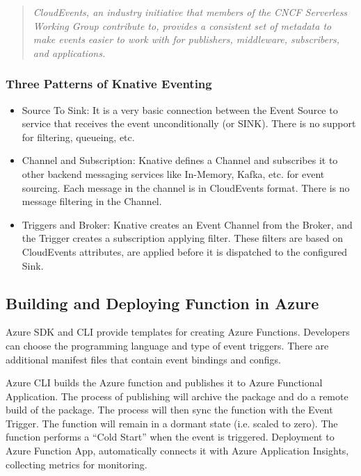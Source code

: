\documentclass[12pt]{article}
\begin{document}
\begin{flushleft}
\begin{quote}
    \textit{CloudEvents, an industry initiative that members of the CNCF Serverless Working Group contribute to, provides a consistent set of metadata to make events easier to work with for publishers, middleware, subscribers, and applications.} 
 \cite{cncf_to_host_cloudevents_in_the_sandbox_2023} 
\end{quote}


\subsubsection{Three Patterns of Knative Eventing}
\begin{itemize}
    \item Source To Sink: It is a very basic connection between the Event Source to service that receives the event unconditionally (or SINK). There is no support for filtering, queueing, etc.

    \item	Channel and Subscription: Knative defines a Channel and subscribes it to other backend messaging services like In-Memory, Kafka, etc. for event sourcing. Each message in the channel is in CloudEvents format. There is no message filtering in the Channel.

    \item Triggers and Broker: Knative creates an Event Channel from the Broker, and the Trigger creates a subscription applying filter. These filters are based on CloudEvents attributes, are applied before it is dispatched to the configured Sink.
\end{itemize}

\subsection{Building and Deploying Function in Azure}
Azure SDK and CLI provide templates for creating Azure Functions. Developers can choose the programming language and type of event triggers. There are additional manifest files that contain event bindings and configs. 

Azure CLI builds the Azure function and publishes it to Azure Functional Application. The process of publishing will archive the package and do a remote build of the package. The process will then sync the function with the Event Trigger. The function will remain in a dormant state (i.e. scaled to zero). The function performs a “Cold Start” when the event is triggered. Deployment to Azure Function App, automatically connects it with Azure Application Insights, collecting metrics for monitoring.


\end{flushleft}
\end{document}
